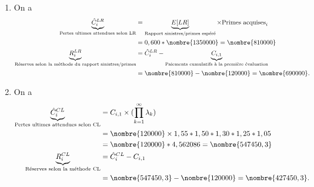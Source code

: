 \begin{exercice}
\begin{sol}
    \begin{enumerate}
    \item On a
      \begin{align*}
        \underbrace{\hat{C}_{i}^{LR}}_{\text{Pertes ultimes attendues selon LR}} &=
                                                                                   \underbrace{\Esp{LR}}_{\text{Rapport sinistres/primes espéré}} \times \text{Primes acquises}_i\\
                                                                                 &= 0,600 * \nombre{1350000} = \nombre{810000} \\
        \underbrace{R_i^{LR}}_{\text{Réserves selon la méthode du rapport sinistres/primes}}
                                                                                 &= \hat{C}_{i}^{LR} - \underbrace{C_{i, 1}}_{\text{Paiements cumulatifs à la première évaluation}} \\
                                                                                 &= \nombre{810000} - \nombre{120000} = \nombre{690000}.
      \end{align*}

    \item On a
      \begin{align*}
        \underbrace{\hat{C}_{i}^{CL}}_{\text{Pertes ultimes attendues selon CL}} &=
                                                                                   C_{i, 1} \times (\prod_{k=1}^{\infty} \lambda_k)\\
                                                                                 &= \nombre{120000} \times  1,55 * 1,50 * 1,30 * 1,25 * 1,05 \\
                                                                                 &=
                                                                                   \nombre{120000}
                                                                                   *
                                                                                   4,562086
                                                                                   =
                                                                                   \nombre{547450,3}
        \\
        \underbrace{R_i^{CL}}_{\text{Réserves selon la méthode CL}}
                                                                                 &= \hat{C}_{i}^{CL} - C_{i, 1} \\
                                                                                 &= \nombre{547450,3} - \nombre{120000} = \nombre{427450,3}.
      \end{align*}


\end{enumerate}
\end{sol}
\end{exercice}
